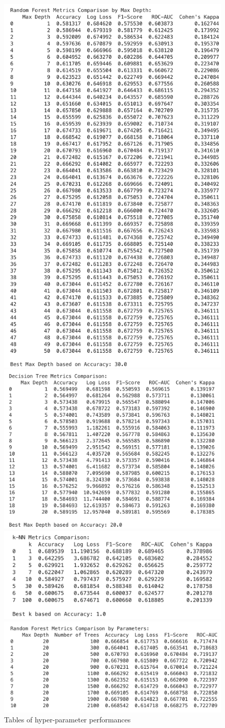 \documentclass{article}
\begin{document}
\begin{figure}[htbp]
\centering
\begin{minipage}{1\textwidth}
  \centering
  \includegraphics[width=0.5\linewidth]{Figures/RF_max_depth_list.png}
\end{minipage}
\begin{minipage}{1\textwidth}
  \centering
  \includegraphics[width=0.5\linewidth]{Figures/DT_hyperparameter_list.png}
\end{minipage}
\begin{minipage}{1\textwidth}
  \centering
  \includegraphics[width=0.5\linewidth]{Figures/KNN_hyperparameter_list.png}
\end{minipage}
\begin{minipage}{1\textwidth}
  \centering
  \includegraphics[width=0.5\linewidth]{Figures/RF_tree_n_list.png}
\end{minipage}
\caption{Tables of hyper-parameter performances}
\label{fig:hyperparameter_table}
\end{figure}
\end{document}
